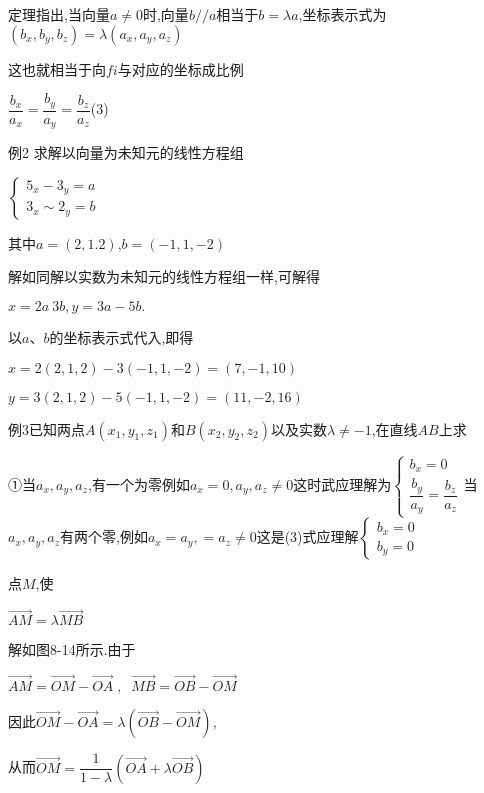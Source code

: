 \documentclass[oneside]{book}
\begin{document}
定理\quad 指出,当向量$a \ne 0$时,向量$b//a$相当于$b = \lambda a$,坐标表示式为$({b_x},{b_y},{b_z}) = \lambda ({a_x},{a_y},{a_z})$

这也就相当于向$fi$与对应的坐标成比例

$\dfrac{{{b_x}}}{{{a_x}}} = \dfrac{{{b_y}}}{{{a_y}}} = \dfrac{{{b_z}}}{{{a_z}}}$(3)

例2 求解以向量为未知元的线性方程组

$\left\{\begin{array}{l}{5_{x}-3_{y}=a} \\ {3_{x} \sim 2_{y}=b}\end{array}\right.$

其中$a = (2,1.2)$,$b = ( - 1,1, - 2)$

解如同解以实数为未知元的线性方程组一样,可解得

$x = 2a~3b,y = 3a - 5b.$

以$a$、$b$的坐标表示式代入,即得

$x=2(2,1,2)-3(-1,1,-2)=(7,-1,10)$

$y=3(2,1,2)-5(-1,1,-2)=(11,-2,16)$

例3已知两点$A\left( {{x_1},{y_1},{z_1}} \right)$和$B\left( {{x_2},{y_2},{z_2}} \right)$以及实数$\lambda  \ne  - 1$,在直线$AB$上求

①当${a_x},{a_y},{a_z}$,有一个为零例如${a_x} = 0,{a_y},{a_z} \ne 0$这时武应理解为$\left\{\begin{array}{l}{b_{x}=0} \\ {\dfrac{b_{y}}{a_{y}}=\dfrac{b_{z}}{a_{z}}}\end{array}\right.$当${a_x},{a_y},{a_z}$有两个零,例如${a_x} = {a_y}, = {a_z} \ne 0$这是(3)式应理解$\left\{\begin{array}{l}{b_{x}=0} \\ {b_{y}=0}\end{array}\right.$

点$M$,使

$\overrightarrow {AM}  = \lambda \overrightarrow {MB} $

解如图8-14所示.由于

$\overrightarrow {AM}  = \overrightarrow {OM}  - \overrightarrow {OA} \;,\;\;\overrightarrow {MB}  = \overrightarrow {OB}  - \overrightarrow {OM} $

因此$\overrightarrow {OM}  - \overrightarrow {OA}  = \lambda (\overrightarrow {OB}  - \overrightarrow {OM} )$,

从而$\overrightarrow {OM}  = \dfrac{1}{{1 - \lambda }}(\overrightarrow {OA}  + \lambda \overrightarrow {OB} )$
\end{document}
